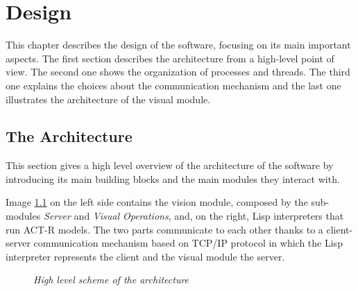 \chapter{Design}\label{chDesign}
	This chapter describes the design of the software, focusing on its main important aspects.
	The first section describes the architecture from a high-level point of view.
	The second one shows the organization of processes and threads.
	The third one explains the choices about the communication mechanism and the last one illustrates the architecture of the visual module. 
	
	\section{The Architecture}
	This section gives a high level overview of the architecture of the software by introducing its main building blocks and the main modules they interact with. 
  
	Image \ref{fig:architecture} on the left side contains the vision module, composed by the sub-modules \emph{Server} and \emph{Visual Operations}, and, on the right, \mbox{Lisp} interpreters that run \mbox{ACT-R} models.
	The two parts communicate to each other thanks to a \mbox{client-server} communication mechanism based on \mbox{TCP/IP} protocol in which the \mbox{Lisp} interpreter represents the client and the visual module the server.
	
	\begin{figure}[h]
	  \begin{center} 
	  \end{center} 
	  \caption{\textit{High level scheme of the architecture}}  
	  \label{fig:architecture}
 	\end{figure}


